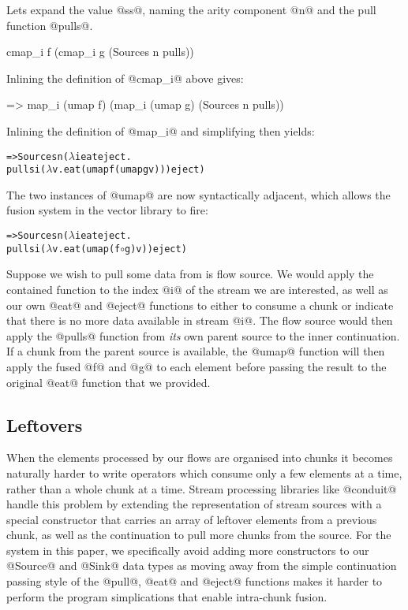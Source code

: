 Lets expand the value @ss@, naming the arity component @n@ and the pull function @pulls@.
\begin{code}
   cmap_i f (cmap_i g (Sources n pulls))
\end{code}

Inlining the definition of @cmap_i@ above gives:
\begin{code}
=> map_i (umap f) (map_i (umap g) (Sources n pulls))
\end{code}

Inlining the definition of @map_i@ and simplifying then yields:
\begin{alltt}
=> Sources n (\(\lambda\)i eat eject.
     pulls i (\(\lambda\)v. eat (umap f (umap g v))) eject)
\end{alltt}
The two instances of @umap@ are now syntactically adjacent, which allows the fusion system in the vector library to fire:

\begin{alltt}
=> Sources n (\(\lambda\)i eat eject.
     pulls i (\(\lambda\)v. eat (umap (f \(\circ\) g) v)) eject)
\end{alltt}

Suppose we wish to pull some data from is flow source. We would apply the contained function to the index @i@ of the stream we are interested, as well as our own @eat@ and @eject@ functions to either to consume a chunk or indicate that there is no more data available in stream @i@. The flow source would then apply the @pulls@ function from \emph{its} own parent source to the inner continuation. If a chunk from the parent source is available, the @umap@ function will then apply the fused @f@ and @g@ to each element before passing the result to the original @eat@ function that we provided.


\subsection{Leftovers}
When the elements processed by our flows are organised into chunks it becomes naturally harder to write operators which consume only a few elements at a time, rather than a whole chunk at a time. Stream processing libraries like @conduit@~\cite{hackage:conduit} handle this problem by extending the representation of stream sources with a special constructor that carries an array of leftover elements from a previous chunk, as well as the continuation to pull more chunks from the source. For the system in this paper, we specifically avoid adding more constructors to our @Source@ and @Sink@ data types as moving away from the simple continuation passing style of the @pull@, @eat@ and @eject@ functions makes it harder to perform the program simplications that enable intra-chunk fusion.

